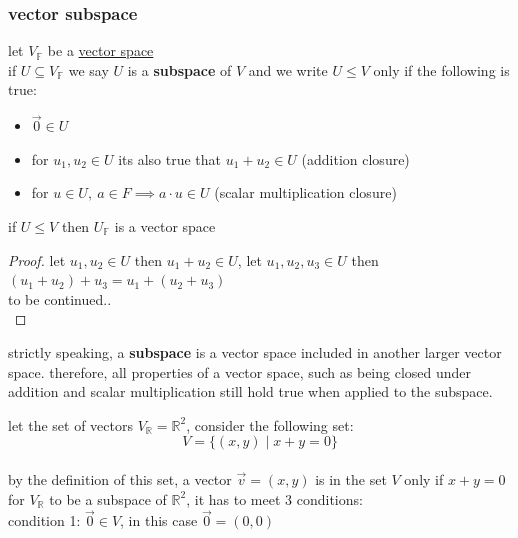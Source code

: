 \documentclass[a4paper,12pt]{article}
\begin{document}
\subsubsection{vector subspace}
\label{sec:org3f77751}
\begin{definition}
let \(V_\mathbb{F}\) be a \hyperref[sec:orgea93933]{vector space}\\
if \(U \subseteq V_\mathbb{F}\) we say \(U\) is a \textbf{subspace} of \(V\) and we write \(U \leq V\) only if the following is true:\\
\begin{itemize}
\item \(\vec0 \in U\)\\
\item for \(u_1,u_2 \in U\) its also true that \(u_1 + u_2 \in U\) (addition closure)\\
\item for \(u \in U,\ a \in F \implies a \cdot u \in U\) (scalar multiplication closure)\\
\end{itemize}
\begin{lemma}
if \(U \leq V\) then \(U_\mathbb{F}\) is a vector space\\
\begin{proof}
let \(u_1,u_2 \in U\) then \(u_1 + u_2 \in U\), let \(u_1,u_2,u_3 \in U\) then \((u_1+u_2)+u_3 = u_1+(u_2+u_3)\)\\
to be continued..\\
\end{proof}
\end{lemma}
\begin{characteristic}
strictly speaking, a \textbf{subspace} is a vector space included in another larger vector space. therefore, all properties of a vector space, such as being closed under addition and scalar multiplication still hold true when applied to the subspace.\\
\end{characteristic}
\begin{my_example}
let the set of vectors \(V_\mathbb{R} = \mathbb{R}^2\), consider the following set:\\
\[ V = \{(x,y) \mid x + y = 0\} \]\\
by the definition of this set, a vector \(\vec{v} = (x,y)\) is in the set \(V\) only if \(x + y = 0\)\\
for \(V_\mathbb{R}\) to be a subspace of \(\mathbb{R}^2\), it has to meet 3 conditions:\\
condition 1: \(\vec0 \in V\), in this case \(\vec0 = (0,0)\)\\

\end{my_example}
\end{definition}
\end{document}
